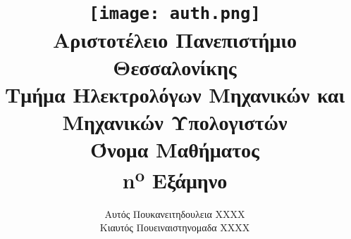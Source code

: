 \title{
	\texttt{[image: auth.png]}\\
	\large{Αριστοτέλειο Πανεπιστήμιο Θεσσαλονίκης}\\
	\large{Τμήμα Ηλεκτρολόγων Μηχανικών και Μηχανικών Υπολογιστών}\\
	\vspace{2cm}
	\LARGE{Όνομα Μαθήματος}\\
	\vspace{0.5cm}
	\large{n\textsuperscript{o} Εξάμηνο}
	\vspace{3cm}
}

\author{
	Αυτός Πουκανειτηδουλεια XXXX\\
	Κιαυτός Πουειναιστηνομαδα XXXX
	\vspace{3cm}
}
